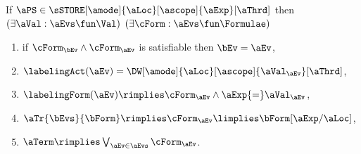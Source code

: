 \medskip
If $\aPS \in \sSTORE[\amode]{\aLoc}[\ascope]{\aExp}[\aThrd]$ then
$(\exists\aVal:\aEvs\fun\Val)$
$(\exists\cForm:\aEvs\fun\Formulae)$
\begin{multicols}{2}
  \begin{enumerate}[topsep=0pt,label=(\textsc{w}\arabic*),ref=\textsc{w}\arabic*]
  \item \label{write-x-E}
    if $\cForm_\bEv\land\cForm_\aEv$ is satisfiable then $\bEv=\aEv$,
  \item \label{write-x-lambda}
    $\labelingAct(\aEv) = \DW[\amode]{\aLoc}[\ascope]{\aVal_\aEv}[\aThrd]$,
  \item \label{write-x-kappa}
    \begin{math}
      \labelingForm(\aEv) \rimplies
      \cForm_\aEv
      \land \aExp{=}\aVal_\aEv
    \end{math},
    
    
  \item \label{write-x-tau}
    \begin{math}
      \aTr{\bEvs}{\bForm} \rimplies 
      \cForm_\aEv
      \limplies 
      \bForm[\aExp/\aLoc]
    \end{math},
  \item \label{write-x-term}
    $\aTerm \rimplies \bigvee_{\aEv\in\aEvs}\cForm_\aEv$.
  \end{enumerate}
\end{multicols}

